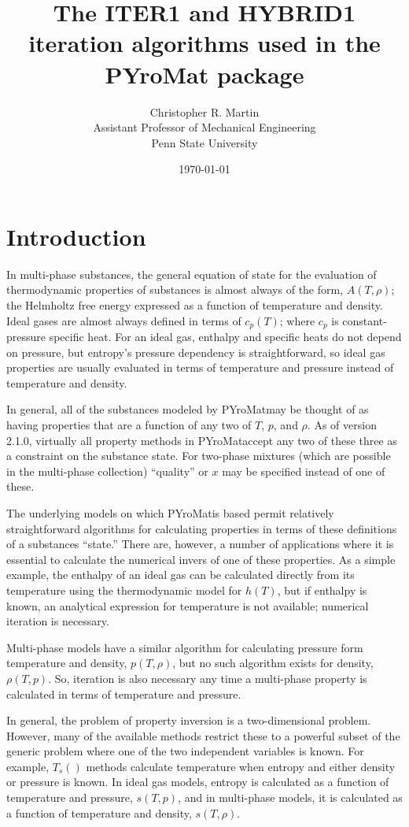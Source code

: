 \documentclass{article}
\title{The ITER1 and HYBRID1 iteration algorithms used in the PYroMat package}
\author{Christopher R. Martin\\Assistant Professor of Mechanical Engineering\\Penn State University}
\date{\today}
\def\pm{PYroMat}
\begin{document}
\maketitle

\section{Introduction}

In multi-phase substances, the general equation of state for the evaluation of thermodynamic properties of substances is almost always of the form, $A(T,\rho)$; the Helmholtz free energy expressed as a function of temperature and density.  Ideal gases are almost always defined in terms of $c_p(T)$; where $c_p$ is constant-pressure specific heat.  For an ideal gas, enthalpy and specific heats do not depend on pressure, but entropy's pressure dependency is straightforward, so ideal gas properties are usually evaluated in terms of temperature and pressure instead of temperature and density.

In general, all of the substances modeled by \pm may be thought of as having properties that are a function of any two of $T$, $p$, and $\rho$.  As of version 2.1.0, virtually all property methods in \pm accept any two of these three as a constraint on the substance state.  For two-phase mixtures (which are possible in the multi-phase collection) ``quality'' or $x$ may be specified instead of one of these.

The underlying models on which \pm is based permit relatively straightforward algorithms for calculating properties in terms of these definitions of a substances ``state.''  There are, however, a number of applications where it is essential to calculate the numerical invers of one of these properties.  As a simple example, the enthalpy of an ideal gas can be calculated directly from its temperature using the thermodynamic model for $h(T)$, but if enthalpy is known, an analytical expression for temperature is not available; numerical iteration is necessary.

Multi-phase models have a similar algorithm for calculating pressure form temperature and density, $p(T,\rho)$, but no such algorithm exists for density, $\rho(T,p)$.  So, iteration is also necessary any time a multi-phase property is calculated in terms of temperature and pressure.

In general, the problem of property inversion is a two-dimensional problem.  However, many of the available methods restrict these to a powerful subset of the generic problem where one of the two independent variables is known.  For example, $T_s()$ methods calculate temperature when entropy and either density or pressure is known.  In ideal gas models, entropy is calculated as a function of temperature and pressure, $s(T,p)$, and in multi-phase models, it is calculated as a function of temperature and density, $s(T,\rho)$. 
\end{document}
